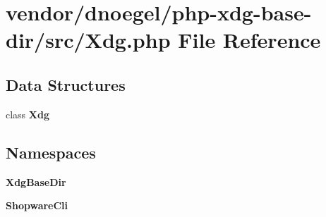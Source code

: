 \section{vendor/dnoegel/php-\/xdg-\/base-\/dir/src/\+Xdg.php File Reference}
\label{_xdg_8php}
\subsection*{Data Structures}
\begin{DoxyCompactItemize}
\item 
class {\bf Xdg}
\end{DoxyCompactItemize}
\subsection*{Namespaces}
\begin{DoxyCompactItemize}
\item 
 {\bf Xdg\+Base\+Dir}
\item 
 {\bf Shopware\+Cli}
\end{DoxyCompactItemize}
